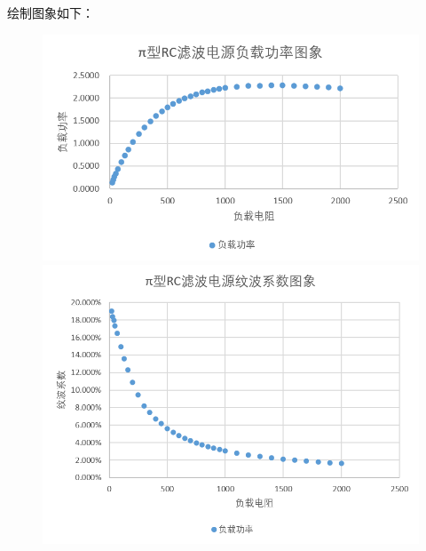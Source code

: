 \documentclass{article}
\begin{document}
\newpage
绘制图象如下：
\begin{figure}[tbp]
    \centering
    \begin{minipage}[t]{0.48\textwidth}
        \centering
        \includegraphics[scale=0.6]{pigl.png}

    \end{minipage}
    \begin{minipage}[t]{0.48\textwidth}
        \centering
        \includegraphics[scale=0.5]{piwb.png}
    \end{minipage}
\end{figure}
\end{document}
